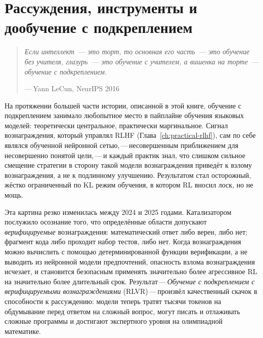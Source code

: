 
\chapter[Рассуждения и дообучение с подкреплением]{Рассуждения, инструменты и дообучение с подкреплением}
\label{ch:reasoning}

\begin{quote}
\itshape
Если интеллект~--- это торт, то основная его часть~--- это обучение без учителя,
глазурь~--- это обучение с учителем, а вишенка на торте~---
обучение с подкреплением.
\par\medskip
\upshape\raggedleft
---\,Yann LeCun, NeurIPS 2016
\end{quote}

\bigskip

На протяжении большей части истории, описанной в этой книге, обучение с подкреплением
занимало любопытное место в пайплайне обучения языковых моделей:
теоретически центральное, практически маргинальное. Сигнал вознаграждения, который
управлял RLHF (Глава~\ref{ch:practical-rlhf}), сам по себе являлся
обученной нейронной сетью,\,---\,несовершенным приближением для
несовершенно понятой цели,\,---\,и каждый практик знал, что слишком сильное
смещение стратегии в сторону такой модели вознаграждения приведёт к
взлому вознаграждения, а не к подлинному улучшению. Результатом стал
осторожный, жёстко ограниченный по KL режим обучения, в котором RL вносил
лоск, но не мощь.

Эта картина резко изменилась между 2024 и 2025 годами. Катализатором послужило
осознание того, что определённые области допускают \emph{верифицируемые} вознаграждения:
математический ответ либо верен, либо нет; фрагмент кода
либо проходит набор тестов, либо нет. Когда вознаграждения можно
вычислить с помощью детерминированной функции верификации, а не выводить из
нейронной модели предпочтений, опасность взлома вознаграждения исчезает,
и становится безопасным применять значительно более агрессивное RL на значительно более
длительный срок. Результат\,---\,\emph{Обучение с подкреплением с верифицируемыми
вознаграждениями} (RLVR)\,---\,произвёл качественный скачок в
способности к рассуждению: модели теперь тратят тысячи токенов на обдумывание
перед ответом на сложный вопрос, могут писать и отлаживать сложные
программы и достигают экспертного уровня на олимпиадной математике.

